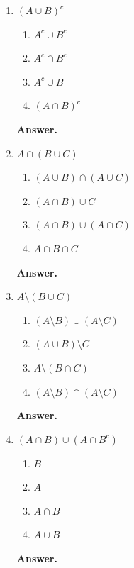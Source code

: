 \documentclass[11pt]{article}
\theoremstyle{definition}
\newenvironment{answer}
  {\par\medskip\noindent\textbf{Answer.}\par\nobreak\smallskip\ignorespaces}
  {\par\medskip}
\begin{document}
\begin{enumerate}[label=(\alph*)]

\item $(A \cup B)^c$
\begin{enumerate}[label=(\roman*), itemsep=0.1em, topsep=0.25em, parsep=0pt]
	\item $A^c \cup B^c$
	\item $A^c \cap B^c$
	\item $A^c \cup B$
	\item $(A \cap B)^c$
\end{enumerate}
\begin{answer}
\end{answer}

\item $A \cap (B \cup C)$
\begin{enumerate}[label=(\roman*), itemsep=0.1em, topsep=0.25em, parsep=0pt]
	\item $(A \cup B) \cap (A \cup C)$
	\item $(A \cap B) \cup C$
	\item $(A \cap B) \cup (A \cap C)$
	\item $A \cap B \cap C$
\end{enumerate}
\begin{answer}
\end{answer}

\item $A \setminus (B \cup C)$
\begin{enumerate}[label=(\roman*), itemsep=0.1em, topsep=0.25em, parsep=0pt]
	\item $(A \setminus B) \cup (A \setminus C)$
	\item $(A \cup B) \setminus C$
	\item $A \setminus (B \cap C)$
	\item $(A \setminus B) \cap (A \setminus C)$
\end{enumerate}
\begin{answer}
\end{answer}

\item $(A \cap B) \cup (A \cap B^c)$
\begin{enumerate}[label=(\roman*), itemsep=0.1em, topsep=0.25em, parsep=0pt]
	\item $B$
	\item $A$
	\item $A \cap B$
	\item $A \cup B$
\end{enumerate}
\begin{answer}
\end{answer}


\end{enumerate}
\end{document}
